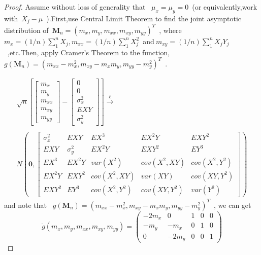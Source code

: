 \documentclass{article}
\newtheorem{proof}{PROOF}
\begin{document}
\begin{proof}
Assume without loss of generality that ~$\mu_x=\mu_y=0$~(or equivalently,work with~$ X_j-\mu$~).First,use Central Limit Theorem to find the joint asymptotic distribution of~$ \textbf{M}_n = (m_x,m_y,m_{xx},m_{xy},m_{yy})^T$~, where ~$m_x = (1/n)\sum_1^nX_j, m_{xx} = (1/n)\sum_1^nX_j^2$~and$~m_{xy} = (1/
			n)\sum_1^nX_jY_j$~,etc.Then, apply Cramer's Theorem to the function, ~$g(\textbf{M}_n) = (m_{xx}-m_x^2,m_{xy}-m_xm_y,m_{yy}-m_y^2)^T$~.

\begin{equation*}
\begin{array}{c}
 \sqrt{n}\left[
 \begin{bmatrix}
m_x\\
m_y \\
m_{xx} \\
m_{xy} \\
m_{yy}
\end{bmatrix}
 -
 \begin{bmatrix}
 0 \\
 0 \\
 \sigma_x^2 \\
 EXY \\
 \sigma_y^2
 \end{bmatrix}
 \right]
\stackrel{\ell}{\longrightarrow} \\
		\\
N\left(\textbf{0},
\begin{bmatrix}
\sigma_x^2 &EXY        &EX^3         &EX^2Y       &EXY^2 \\ 
EXY        &\sigma_y^2 &EX^2Y        &EXY^2       &EY^3 \\
EX^3       &EX^2Y      &var(X^2)     &cov(X^2,XY) &cov(X^2,Y^2) \\
EX^2Y      &EXY^2      &cov(X^2,XY)  &var(XY)     &cov(XY,Y^2) \\
EXY^2      &EY^3       &cov(X^2,Y^2) &cov(XY,Y^2) &var(Y^2)   
\end{bmatrix}\right)
\end{array}
 \end{equation*}
 and note that ~$g(\textbf{M}_n) = (m_{xx}-m_x^2,m_{xy}-m_xm_y,m_{yy}-m_y^    2)^T$~,
 we can get 
\begin{equation*}
\dot{g}(m_x,m_y,m_{xx},m_{xy},m_{yy}) = \left(\begin{array}{ccccc}
			-2m_x &0    &1    &0  &0 \\
			-m_y  &-m_x &0    &1  &0 \\
			0     &-2m_y&0    &0  &1  
			\end{array}\right)

\end{equation*}
\end{proof}
\end{document}
